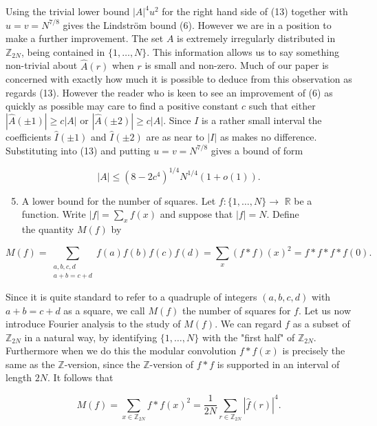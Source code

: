 \documentclass[10pt]{article}
\begin{document}
Using the trivial lower bound $|A|^{4} u^{2}$ for the right hand side of (13) together with $u=v=N^{7 / 8}$ gives the Lindström bound (6). However we are in a position to make a further improvement. The set $A$ is extremely irregularly distributed in $\mathbb{Z}_{2 N}$, being contained in $\{1, \ldots, N\}$. This information allows us to say something non-trivial about $\hat{A}(r)$ when $r$ is small and non-zero. Much of our paper is concerned with exactly how much it is possible to deduce from this observation as regards (13). However the reader who is keen to see an improvement of (6) as quickly as possible may care to find a positive constant $c$ such that either $|\hat{A}( \pm 1)| \geq c|A|$ or $|\hat{A}( \pm 2)| \geq c|A|$. Since $I$ is a rather small interval the coefficients $\hat{I}( \pm 1)$ and $\hat{I}( \pm 2)$ are as near to $|I|$ as makes no difference. Substituting into (13) and putting $u=v=N^{7 / 8}$ gives a bound of form

$$
|A| \leq\left(8-2 c^{4}\right)^{1 / 4} N^{1 / 4}(1+o(1)) .
$$

\begin{enumerate}
  \setcounter{enumi}{4}
  \item A lower bound for the number of squares. Let $f:\{1, \ldots, N\} \rightarrow$ $\mathbb{R}$ be a function. Write $|f|=\sum_{x} f(x)$ and suppose that $|f|=N$. Define\\
the quantity $M(f)$ by
\end{enumerate}

$$
M(f)=\sum_{\substack{a, b, c, d \\ a+b=c+d}} f(a) f(b) f(c) f(d)=\sum_{x}(f * f)(x)^{2}=f * f * f * f(0) .
$$

Since it is quite standard to refer to a quadruple of integers $(a, b, c, d)$ with $a+b=c+d$ as a square, we call $M(f)$ the number of squares for $f$. Let us now introduce Fourier analysis to the study of $M(f)$. We can regard $f$ as a subset of $\mathbb{Z}_{2 N}$ in a natural way, by identifying $\{1, \ldots, N\}$ with the "first half" of $\mathbb{Z}_{2 N}$. Furthermore when we do this the modular convolution $f * f(x)$ is precisely the same as the $\mathbb{Z}$-version, since the $\mathbb{Z}$-version of $f * f$ is supported in an interval of length $2 N$. It follows that


\begin{equation*}
M(f)=\sum_{x \in \mathbb{Z}_{2 N}} f * f(x)^{2}=\frac{1}{2 N} \sum_{r \in \mathbb{Z}_{2 N}}|\hat{f}(r)|^{4} . \tag{14}
\end{equation*}
\end{document}
